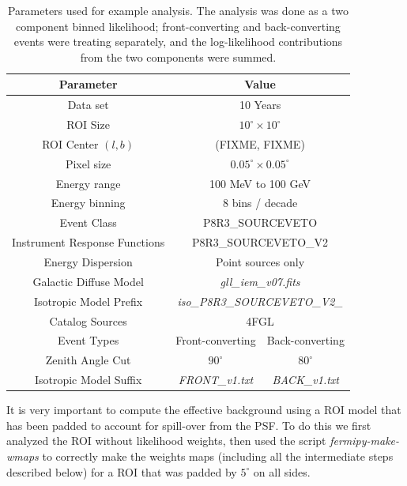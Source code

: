 \documentclass[preprint]{aastex}
\begin{document}
\begin{table}[!ht]
\begin{centering}
\begin{tabular}{cc|c}
Parameter & \multicolumn{2}{c}{Value} \\ \hline\hline
Data set & \multicolumn{2}{c}{10 Years} \\
ROI Size & \multicolumn{2}{c}{$10^\circ \times 10^\circ$} \\
ROI Center $(l,b)$ & \multicolumn{2}{c}{(FIXME, FIXME)} \\
Pixel size & \multicolumn{2}{c}{$0.05^\circ \times 0.05^\circ$} \\
Energy range & \multicolumn{2}{c}{100 MeV to 100 GeV} \\
Energy binning & \multicolumn{2}{c}{8 bins / decade} \\
Event Class & \multicolumn{2}{c}{P8R3\_SOURCEVETO} \\
Instrument Response Functions & \multicolumn{2}{c}{P8R3\_SOURCEVETO\_V2} \\
Energy Dispersion & \multicolumn{2}{c}{Point sources only} \\
Galactic Diffuse Model & \multicolumn{2}{c}{{\it gll\_iem\_v07.fits}} \\
Isotropic Model Prefix & \multicolumn{2}{c}{{\it iso\_P8R3\_SOURCEVETO\_V2\_}} \\
Catalog Sources  & \multicolumn{2}{c}{4FGL} \\ \hline
Event Types & Front-converting & Back-converting \\
Zenith Angle Cut & $90^\circ$ & $80^\circ$ \\
Isotropic Model Suffix & {\it FRONT\_v1.txt} & {\it BACK\_v1.txt} \\
\end{tabular}
\caption{Parameters used for example analysis.  The analysis was done as a two
  component binned likelihood; front-converting and back-converting 
  events were treating separately, and the log-likelihood contributions from the two
  components were summed.}
\label{tab:analysis_params}
\end{centering}
\end{table}

It is very important to compute the effective background using a ROI 
model that has been padded to account for spill-over from the PSF.  To do this
we first analyzed the ROI without likelihood weights, then used the
script {\it fermipy-make-wmaps} to correctly make the weights maps
(including all the intermediate steps described below) for a ROI that 
was padded by $5^\circ$ on all sides.
\end{document}
